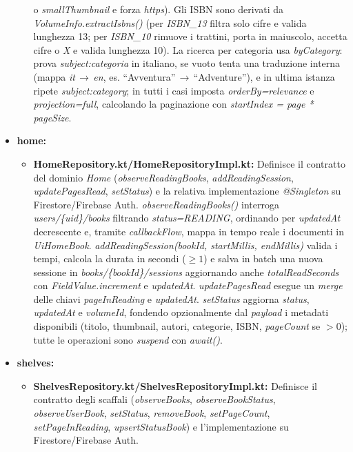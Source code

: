 \documentclass{article}
\begin{document}
\begin{itemize}
\begin{itemize}
    o \textit{smallThumbnail} e forza \textit{https}). Gli ISBN sono derivati da \textit{VolumeInfo.extractIsbns()} (per \textit{ISBN\_13} filtra solo cifre e valida lunghezza 13; per \textit{ISBN\_10} rimuove i trattini, porta in maiuscolo, accetta cifre o \textit{X} e valida lunghezza 10). 
    La ricerca per categoria usa \textit{byCategory}: prova \textit{subject:categoria} in italiano, se vuoto tenta una traduzione interna (mappa \textit{it}\,$\rightarrow$\,\textit{en}, es. “Avventura”\,$\rightarrow$\,“Adventure”), e in ultima istanza ripete \textit{subject:category}; 
    in tutti i casi imposta \textit{orderBy=relevance} e \textit{projection=full}, calcolando la paginazione con \textit{startIndex = page * pageSize}.
  \end{itemize}
  \item \textbf{home:}
  \begin{itemize}
    \item \textbf{HomeRepository.kt/HomeRepositoryImpl.kt:} Definisce il contratto del dominio \textit{Home} (\textit{observeReadingBooks}, \textit{addReadingSession}, \textit{updatePagesRead}, \textit{setStatus}) e la relativa implementazione \textit{@Singleton} su Firestore/Firebase Auth. 
    \textit{observeReadingBooks()} interroga \textit{users/\{uid\}/books} filtrando \textit{status=READING}, ordinando per \textit{updatedAt} decrescente e, tramite \textit{callbackFlow}, mappa in tempo reale i documenti in \textit{UiHomeBook}. \textit{addReadingSession(bookId, startMillis, endMillis)} 
    valida i tempi, calcola la durata in secondi (\(\ge 1\)) e salva in batch una nuova sessione in \textit{books/\{bookId\}/sessions} aggiornando anche \textit{totalReadSeconds} con \textit{FieldValue.increment} e \textit{updatedAt}. \textit{updatePagesRead} esegue un \textit{merge} delle chiavi \textit{pageInReading} 
    e \textit{updatedAt}. \textit{setStatus} aggiorna \textit{status}, \textit{updatedAt} e \textit{volumeId}, fondendo opzionalmente dal \textit{payload} i metadati disponibili (titolo, thumbnail, autori, categorie, ISBN, \textit{pageCount} se \(>0\)); tutte le operazioni sono \textit{suspend} con \textit{await()}.
  \end{itemize}
  \item \textbf{shelves:}
  \begin{itemize}
    \item \textbf{ShelvesRepository.kt/ShelvesRepositoryImpl.kt:} Definisce il contratto degli scaffali (\textit{observeBooks}, \textit{observeBookStatus}, \textit{observeUserBook}, \textit{setStatus}, \textit{removeBook}, \textit{setPageCount}, \textit{setPageInReading}, \textit{upsertStatusBook}) e l’implementazione su Firestore/Firebase Auth. 

\end{itemize}
\end{itemize}
\end{document}
